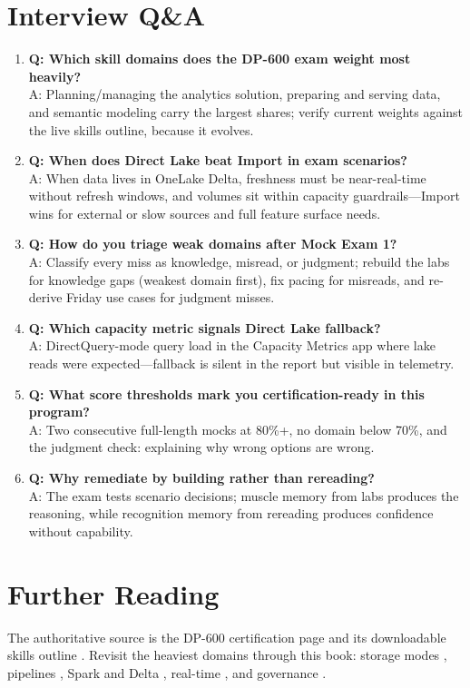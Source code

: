 \section{Interview Q\&A}
\begin{enumerate}
    \item \textbf{Q: Which skill domains does the DP-600 exam weight most heavily?}\\
    A: Planning/managing the analytics solution, preparing and serving data, and semantic modeling carry the largest shares; verify current weights against the live skills outline, because it evolves.
    \item \textbf{Q: When does Direct Lake beat Import in exam scenarios?}\\
    A: When data lives in OneLake Delta, freshness must be near-real-time without refresh windows, and volumes sit within capacity guardrails---Import wins for external or slow sources and full feature surface needs.
    \item \textbf{Q: How do you triage weak domains after Mock Exam 1?}\\
    A: Classify every miss as knowledge, misread, or judgment; rebuild the labs for knowledge gaps (weakest domain first), fix pacing for misreads, and re-derive Friday use cases for judgment misses.
    \item \textbf{Q: Which capacity metric signals Direct Lake fallback?}\\
    A: DirectQuery-mode query load in the Capacity Metrics app where lake reads were expected---fallback is silent in the report but visible in telemetry.
    \item \textbf{Q: What score thresholds mark you certification-ready in this program?}\\
    A: Two consecutive full-length mocks at 80\%+, no domain below 70\%, and the judgment check: explaining why wrong options are wrong.
    \item \textbf{Q: Why remediate by building rather than rereading?}\\
    A: The exam tests scenario decisions; muscle memory from labs produces the reasoning, while recognition memory from rereading produces confidence without capability.
\end{enumerate}

\section{Further Reading}
The authoritative source is the DP-600 certification page and its downloadable skills outline \cite{microsoftDp600}. Revisit the heaviest domains through this book: storage modes \cite{microsoftDirectLake,microsoftFabricDirectLakeFallback}, pipelines \cite{microsoftFabricPipelines}, Spark and Delta \cite{microsoftFabricSparkCompute,deltaLakeDocs}, real-time \cite{microsoftFabricEventstreams,microsoftKQL}, and governance \cite{microsoftFabricSecurity,microsoftPurviewFabric}.

